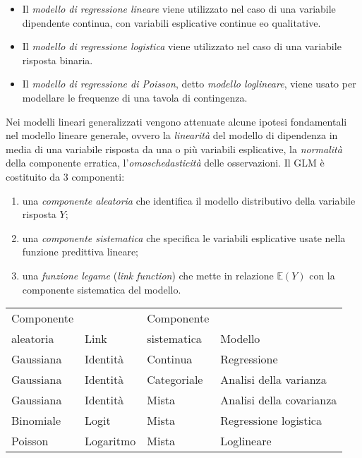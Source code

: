 \begin{itemize}
\item Il \emph{modello di regressione lineare} viene utilizzato
      nel caso di una variabile dipendente continua, con variabili
      esplicative continue e\/o qualitative.  
    \item Il \emph{modello di regressione logistica} viene
      utilizzato nel caso di una variabile risposta binaria.
    \item Il \emph{modello di regressione di Poisson}, detto
      \emph{modello loglineare}, viene usato per modellare le
      frequenze di una tavola di contingenza.
\end{itemize}
Nei modelli lineari generalizzati vengono attenuate alcune ipotesi fondamentali nel modello lineare generale, ovvero 
 la \emph{linearit\`a} del modello di dipendenza in media di una variabile
  risposta da una o pi\`u variabili esplicative, 
 la \emph{normalit\`a}
  della componente erratica,
 l'\emph{omoschedasticit\`a} delle
  osservazioni. 
Il GLM \`e costituito da 3 componenti:
    \begin{enumerate}
    \item una \emph{componente aleatoria} che identifica il modello
      distributivo della variabile risposta $Y$;
    \item una \emph{componente sistematica} che specifica le
      variabili esplicative usate nella funzione predittiva lineare;
    \item una \emph{funzione legame} (\emph{link function}) che mette in relazione $\mathbb{E}(Y)$ con la componente sistematica del modello.
    \end{enumerate}

    \begin{center}
      \begin{tabular}{llll}
        \hline%
        Componente & & Componente & \\
        aleatoria & Link & sistematica & Modello \\
        \hline
        Gaussiana & Identit\`a & Continua & Regressione \\
        Gaussiana & Identit\`a & Categoriale & Analisi della varianza \\
        Gaussiana & Identit\`a & Mista & Analisi della covarianza \\
        Binomiale & Logit & Mista & Regressione logistica \\
        Poisson & Logaritmo & Mista & Loglineare \\\hline%
      \end{tabular}
    \end{center}

